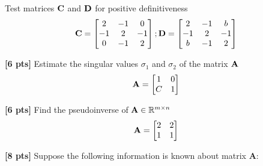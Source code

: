 \documentclass[11pt,addpoints,answers]{exam}
\numberwithin{equation}{section} %
\numberwithin{figure}{section} %
\numberwithin{table}{section} %
\begin{document}
\begin{questions}
    Test matrices $\mathbf{C}$ and $\mathbf{D}$ for positive definitiveness
    \begin{align*}
        \mathbf{C}=\begin{bmatrix}
                 2 & -1 & 0 \\
                 -1 & 2 & -1 \\
                 0 & -1 & 2
                \end{bmatrix};
        \mathbf{D}=\begin{bmatrix}
                 2 & -1 & b \\
                 -1 & 2 & -1 \\
                 b & -1 & 2
                \end{bmatrix}
    \end{align*}
    \begin{tcolorbox}[fit,height=7cm, width=\textwidth, blank, borderline={0.5pt}{-2pt},halign=center, valign=center, nobeforeafter]
    \end{tcolorbox}


    \question \textbf{[6 pts]}   Estimate the singular values $\sigma_1$ and $\sigma_2$ of the matrix $\mathbf{A}$
    \begin{align*}
        \mathbf{A} = \begin{bmatrix}
            1 & 0 \\ C & 1
        \end{bmatrix}
    \end{align*}

    \begin{tcolorbox}[fit,height=7cm, width=\textwidth, blank, borderline={0.5pt}{-2pt},halign=center, valign=center, nobeforeafter]
    \end{tcolorbox}

    \question \textbf{[6 pts]}  Find the pseudoinverse of $\mathbf{A} \in \mathbb{R}^{m \times n}$
    \begin{align*}
        \mathbf{A} = \begin{bmatrix}
            2 & 2 \\ 1 & 1
        \end{bmatrix}
    \end{align*}
    \begin{tcolorbox}[fit,height=7cm, width=\textwidth, blank, borderline={0.5pt}{-2pt},halign=center, valign=center, nobeforeafter]
    \end{tcolorbox}

    \question \textbf{[8 pts]} Suppose the following information is known about matrix $\mathbf{A}$:
    

\end{questions}
\end{document}
